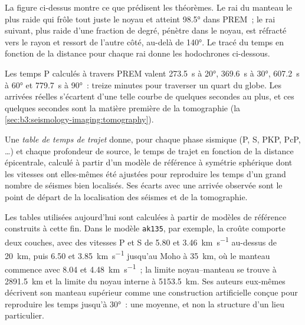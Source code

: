 La figure ci-dessus montre ce que prédisent les théorèmes. Le rai du manteau le plus raide qui
frôle tout juste le noyau et atteint \ang{98.5} dans PREM~; le rai suivant, plus raide d'une
fraction de degré, pénètre dans le noyau, est réfracté vers le rayon et ressort
de l'autre côté, au-delà de \ang{140}. Le tracé du temps en fonction de la distance pour
chaque rai donne les hodochrones ci-dessous.

Les temps P calculés à travers PREM valent \qty{273.5}{s} à \ang{20},
\qty{369.6}{s} à \ang{30}, \qty{607.2}{s} à \ang{60} et \qty{779.7}{s} à
\ang{90}~: treize minutes pour traverser un quart du globe.
Les arrivées réelles s'écartent d'une telle courbe de quelques secondes au plus, et
ces quelques secondes sont la matière première de la tomographie (la \cref{sec:b3:seismology-imaging:tomography}).

\begin{definition}\label{def:b3:seismology-imaging:tables}
Une \emph{table de temps de trajet} donne, pour chaque
phase sismique (P, S, PKP, PcP, \dots) et chaque profondeur de source, le temps de
trajet en fonction de la distance épicentrale, calculé à partir d'un modèle de référence à symétrie sphérique
dont les vitesses ont elles-mêmes été ajustées pour reproduire les temps d'un grand nombre
de séismes bien localisés. Ses écarts avec une arrivée observée sont le point de départ
de la localisation des séismes et de la tomographie.
\end{definition}

Les tables utilisées aujourd'hui sont calculées à partir de modèles de référence
construits à cette fin. Dans le modèle \texttt{ak135}, par exemple, la croûte comporte
deux couches, avec des vitesses P et S de 5.80 et \qty{3.46}{km.s^{-1}} au-dessus de
\qty{20}{km}, puis 6.50 et \qty{3.85}{km.s^{-1}} jusqu'au Moho à \qty{35}{km}, où le
manteau commence avec 8.04 et \qty{4.48}{km.s^{-1}}~; la limite noyau--manteau se
trouve à \qty{2891.5}{km} et la limite du noyau interne à \qty{5153.5}{km}.
Ses auteurs eux-mêmes décrivent son manteau supérieur comme une construction artificielle
conçue pour reproduire les temps jusqu'à \ang{30}~: une moyenne, et non la structure
d'un lieu particulier.

